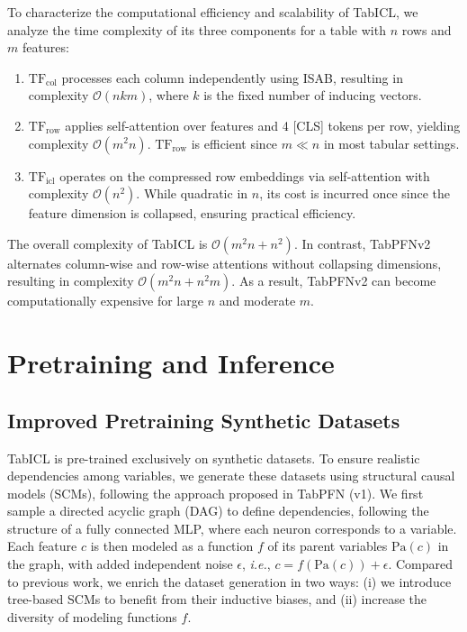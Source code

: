 \documentclass{article}
\theoremstyle{plain}
\theoremstyle{definition}
\theoremstyle{remark}
\newcommand{\TFcol}{\text{TF}_{\text{col}}}
\newcommand{\TFrow}{\text{TF}_{\text{row}}}
\newcommand{\TFicl}{\text{TF}_{\text{icl}}}
\begin{document}
To characterize the computational efficiency and scalability of TabICL, we analyze the time complexity of its three components for a table with $n$ rows and $m$ features:

\begin{enumerate}[itemsep=2pt, parsep=0pt, topsep=0pt]
    \item $\TFcol$ processes each column independently using ISAB, resulting in complexity $\mathcal{O}(n k m)$, where $k$ is the fixed number of inducing vectors.
    \item $\TFrow$ applies self-attention over features and 4 [CLS] tokens per row, yielding complexity $\mathcal{O}(m^2 n)$. $\TFrow$ is efficient since \( m \ll n \) in most tabular settings.
    \item $\TFicl$ operates on the compressed row embeddings via self-attention with complexity $\mathcal{O}(n^2)$. While quadratic in \( n \), its cost is incurred once since the feature dimension is collapsed, ensuring practical efficiency.
\end{enumerate}

The overall complexity of TabICL is $\mathcal{O}(m^2 n + n^2)$. In contrast, TabPFNv2 alternates column-wise and row-wise attentions without collapsing dimensions, resulting in complexity $\mathcal{O}(m^2 n + n^2 m)$. As a result, TabPFNv2 can become computationally expensive for large $n$ and moderate $m$.

\section{Pretraining and Inference}

\subsection{Improved Pretraining Synthetic Datasets}
TabICL is pre-trained exclusively on synthetic datasets. To ensure realistic dependencies among variables, we generate these datasets using structural causal models (SCMs), following the approach proposed in TabPFN (v1). We first sample a directed acyclic graph (DAG) to define dependencies, following the structure of a fully connected MLP, where each neuron corresponds to a variable. Each feature \( c \)  is then modeled as a function \( f \) of its parent variables \( \text{Pa}(c) \) in the graph, with added independent noise \( \epsilon \), \emph{i.e.}, \( c = f(\text{Pa}(c)) + \epsilon \). Compared to previous work, we enrich the dataset generation in two ways: (i) we introduce tree-based SCMs to benefit from their inductive biases, and (ii) increase the diversity of modeling functions $f$.
\end{document}
